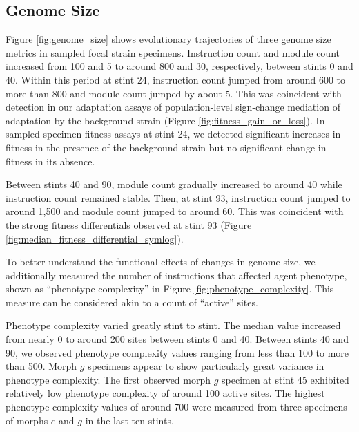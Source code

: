 \subsection{Genome Size}



Figure \ref{fig:genome_size} shows evolutionary trajectories of three genome size metrics in sampled focal strain specimens.
Instruction count and module count increased from 100 and 5 to around 800 and 30, respectively, between stints 0 and 40.
Within this period at stint 24, instruction count jumped from around 600 to more than 800 and module count jumped by about 5.
This was coincident with detection in our adaptation assays of population-level sign-change mediation of adaptation by the background strain (Figure \ref{fig:fitness_gain_or_loss}).
In sampled specimen fitness assays at stint 24, we detected significant increases in fitness in the presence of the background strain but no significant change in fitness in its absence.

Between stints 40 and 90, module count gradually increased to around 40 while instruction count remained stable.
Then, at stint 93, instruction count jumped to around 1,500 and module count jumped to around 60.
This was coincident with the strong fitness differentials observed at stint 93 (Figure \ref{fig:median_fitness_differential_symlog}).

To better understand the functional effects of changes in genome size, we additionally measured the number of instructions that affected agent phenotype, shown as ``phenotype complexity'' in Figure \ref{fig:phenotype_complexity}.
This measure can be considered akin to a count of ``active'' sites.

Phenotype complexity varied greatly stint to stint.
The median value increased from nearly 0 to around 200 sites between stints 0 and 40.
Between stints 40 and 90, we observed phenotype complexity values ranging from less than 100 to more than 500.
Morph $g$ specimens appear to show particularly great variance in phenotype complexity.
The first observed morph $g$ specimen at stint 45 exhibited relatively low phenotype complexity of around 100 active sites.
The highest phenotype complexity values of around 700 were measured from three specimens of morphs $e$ and $g$ in the last ten stints.
